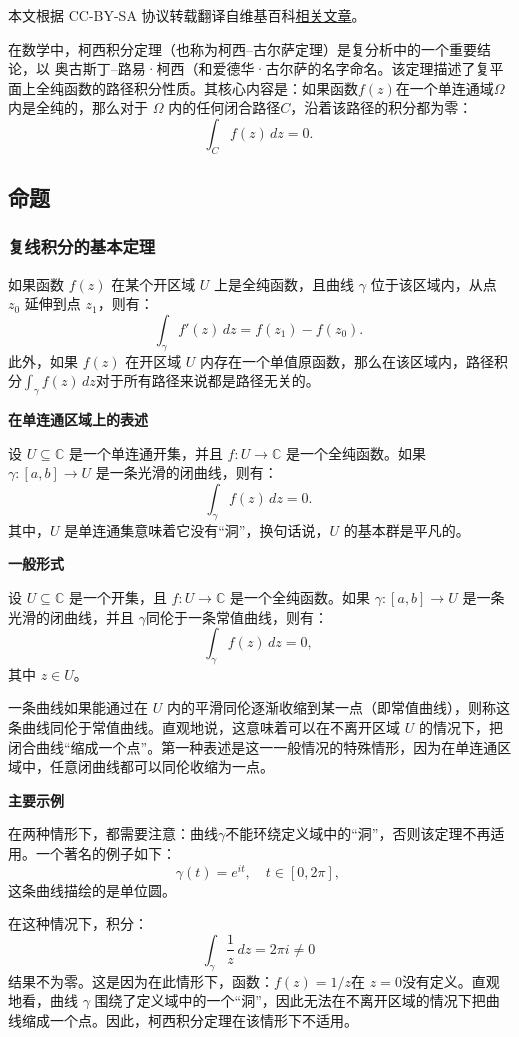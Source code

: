 
本文根据 CC-BY-SA 协议转载翻译自维基百科\href{https://en.wikipedia.org/wiki/Cauchy\%27s_integral_theorem}{相关文章}。

在数学中，柯西积分定理（也称为柯西–古尔萨定理）是复分析中的一个重要结论，以 奥古斯丁–路易·柯西（和爱德华·古尔萨的名字命名。该定理描述了复平面上全纯函数的路径积分性质。其核心内容是：如果函数$f(z)$在一个单连通域$\Omega$ 内是全纯的，那么对于 $\Omega$ 内的任何闭合路径$C$，沿着该路径的积分都为零：
$$
\int_{C} f(z)\, dz = 0.~
$$
\subsection{命题}
\subsubsection{复线积分的基本定理}
如果函数 $f(z)$ 在某个开区域 $U$ 上是全纯函数，且曲线 $\gamma$ 位于该区域内，从点 $z_0$ 延伸到点 $z_1$，则有：
$$
\int_{\gamma} f'(z)\,dz = f(z_1) - f(z_0).~
$$
此外，如果 $f(z)$ 在开区域 $U$ 内存在一个单值原函数，那么在该区域内，路径积分$\int_{\gamma} f(z)\,dz$对于所有路径来说都是路径无关的。

\textbf{在单连通区域上的表述}

设 $U \subseteq \mathbb{C}$ 是一个单连通开集，并且 $f: U \to \mathbb{C}$ 是一个全纯函数。如果 $\gamma: [a, b] \to U$ 是一条光滑的闭曲线，则有：
$$
\int_{\gamma} f(z)\,dz = 0.~
$$
其中，$U$ 是单连通集意味着它没有“洞”，换句话说，$U$ 的基本群是平凡的。

\textbf{一般形式}

设 $U \subseteq \mathbb{C}$ 是一个开集，且 $f: U \to \mathbb{C}$ 是一个全纯函数。如果 $\gamma: [a, b] \to U$ 是一条光滑的闭曲线，并且 $\gamma$同伦于一条常值曲线，则有：
$$
\int_{\gamma} f(z)\,dz = 0,~
$$
其中 $z \in U$。

一条曲线如果能通过在 $U$ 内的平滑同伦逐渐收缩到某一点（即常值曲线），则称这条曲线同伦于常值曲线。直观地说，这意味着可以在不离开区域 $U$ 的情况下，把闭合曲线“缩成一个点”。第一种表述是这一一般情况的特殊情形，因为在单连通区域中，任意闭曲线都可以同伦收缩为一点。

\textbf{主要示例}

在两种情形下，都需要注意：曲线$\gamma$不能环绕定义域中的“洞”，否则该定理不再适用。一个著名的例子如下：
$$
\gamma(t) = e^{it}, \quad t \in [0, 2\pi],~
$$
这条曲线描绘的是单位圆。

在这种情况下，积分：
$$
\int_{\gamma} \frac{1}{z} \, dz = 2\pi i \neq 0~
$$
结果不为零。这是因为在此情形下，函数：$f(z) = 1/z$在 $z = 0$没有定义。直观地看，曲线 $\gamma$ 围绕了定义域中的一个“洞”，因此无法在不离开区域的情况下把曲线缩成一个点。因此，柯西积分定理在该情形下不适用。
